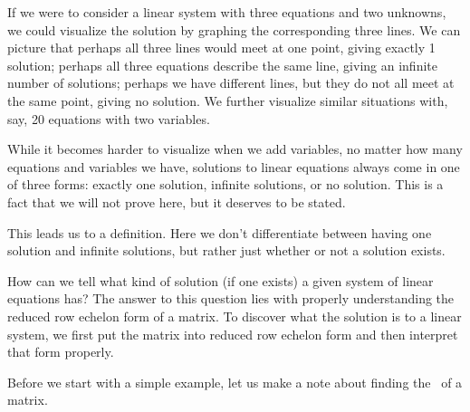 If we were to consider a linear system with three equations and two unknowns, we could visualize the solution by graphing the corresponding three lines. We can picture that perhaps all three lines would meet at one point, giving exactly 1 solution; perhaps all three equations describe the same line, giving an infinite number of solutions; perhaps we have different lines, but they do not all meet at the same point, giving no solution. We further visualize similar situations with, say, 20 equations with two variables.

While it becomes harder to visualize when we add variables, no matter how many equations and variables we have, solutions to linear equations always come in one of three forms: exactly one solution, infinite solutions, or no solution. This is a fact that we will not prove here, but it deserves to be stated.

\smallskip


\smallskip

This leads us to a definition. Here we don't differentiate between having one solution and infinite solutions, but rather just whether or not a solution exists.

\smallskip


\smallskip

How can we tell what kind of solution (if one exists) a given system of linear equations has? The answer to this question lies with properly understanding the reduced row echelon form of a matrix. To discover what the solution is to a linear system, we first put the matrix into reduced row echelon form and then interpret that form properly.

Before we start with a simple example, let us make a note about finding the \rref\ of a matrix.\\

